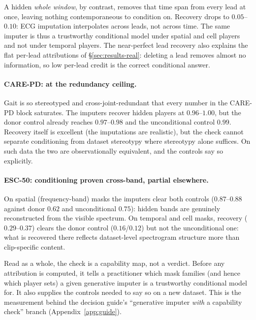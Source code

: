 A hidden \emph{whole window}, by contrast, removes that time span from
every lead at once, leaving nothing contemporaneous to condition on.
Recovery drops to $0.05$--$0.10$: ECG imputation interpolates across leads,
not across time.  The same imputer is thus a trustworthy conditional model
under spatial and cell players and not under temporal players.  The
near-perfect lead recovery also explains the flat per-lead attributions of
\S\ref{sec:results-real}: deleting a lead removes almost no information, so
low per-lead credit is the correct conditional answer.

\paragraph{CARE-PD: at the redundancy ceiling.}
Gait is so stereotyped and cross-joint-redundant that every number in the
CARE-PD block saturates.  The imputers recover hidden players at
$0.96$--$1.00$, but the donor control already reaches $0.97$--$0.98$ and
the unconditional control $0.99$.  Recovery itself is excellent (the
imputations are realistic), but the check cannot separate conditioning from dataset
stereotypy where stereotypy alone suffices.  On such data the two are
observationally equivalent, and the controls say so explicitly.

\paragraph{ESC-50: conditioning proven cross-band, partial elsewhere.}
On spatial (frequency-band) masks the imputers clear both controls
($0.87$--$0.88$ against donor $0.62$ and unconditional $0.75$): hidden bands
are genuinely reconstructed from the visible spectrum.  On temporal and cell
masks, recovery ($0.29$--$0.37$) clears the donor control ($0.16$/$0.12$)
but not the unconditional one: what is recovered there reflects
dataset-level spectrogram structure more than clip-specific content.

Read as a whole, the check is a capability map, not a verdict.  Before any
attribution is computed, it tells a practitioner which mask families (and
hence which player sets) a given generative imputer is a trustworthy
conditional model for.  It also supplies the controls needed to say so on a
new dataset.  This is the measurement behind the decision guide's
``generative imputer \emph{with} a capability check'' branch
(Appendix~\ref{app:guide}).

